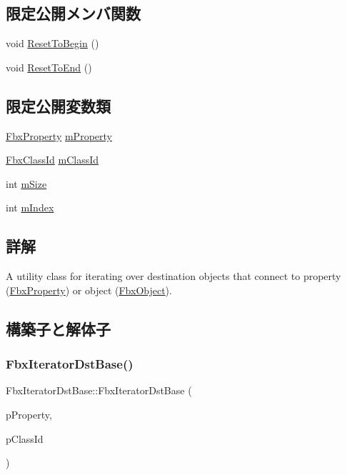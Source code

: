\subsection*{限定公開メンバ関数}
\begin{DoxyCompactItemize}
\item 
void \hyperlink{class_fbx_iterator_dst_base_aa732906f31b3b79c5380186d02cb7159}{Reset\+To\+Begin} ()
\item 
void \hyperlink{class_fbx_iterator_dst_base_ab742852e3955c14f6299f6104120c2d2}{Reset\+To\+End} ()
\end{DoxyCompactItemize}
\subsection*{限定公開変数類}
\begin{DoxyCompactItemize}
\item 
\hyperlink{class_fbx_property}{Fbx\+Property} \hyperlink{class_fbx_iterator_dst_base_a3f4bd3e4d6427c2183c2fae3c3cc3033}{m\+Property}
\item 
\hyperlink{class_fbx_class_id}{Fbx\+Class\+Id} \hyperlink{class_fbx_iterator_dst_base_a6de7e7773a295d5cd2cf5e1dbb1e355a}{m\+Class\+Id}
\item 
int \hyperlink{class_fbx_iterator_dst_base_a9bac54bd7497f350e9a7f8be88d711eb}{m\+Size}
\item 
int \hyperlink{class_fbx_iterator_dst_base_ad24255785c3869f0c76d37aa4cedf6aa}{m\+Index}
\end{DoxyCompactItemize}


\subsection{詳解}
A utility class for iterating over destination objects that connect to property (\hyperlink{class_fbx_property}{Fbx\+Property}) or object (\hyperlink{class_fbx_object}{Fbx\+Object}). 

\subsection{構築子と解体子}
\mbox{\label{class_fbx_iterator_dst_base_ab8ebd364825476724f9db0ca76bf6f9b}} 
\subsubsection{\texorpdfstring{Fbx\+Iterator\+Dst\+Base()}{FbxIteratorDstBase()}\hspace{0.1cm}{\footnotesize\ttfamily [1/2]}}
{\footnotesize\ttfamily Fbx\+Iterator\+Dst\+Base\+::\+Fbx\+Iterator\+Dst\+Base (\begin{DoxyParamCaption}\item[{\hyperlink{class_fbx_property}{Fbx\+Property} \&}]{p\+Property,  }\item[{\hyperlink{class_fbx_class_id}{Fbx\+Class\+Id}}]{p\+Class\+Id }\end{DoxyParamCaption})}

